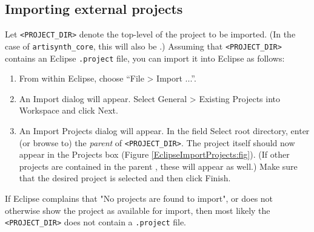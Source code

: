 \subsection{Importing external projects}
\label{importingExternalProjects}

Let {\tt <PROJECT\_DIR>} denote the top-level \directory{}
of the project to be imported.
(In the case of {\tt artisynth\_core}, this will also be
\ArtHome[].) Assuming that {\tt <PROJECT\_DIR>} contains an Eclipse {\tt .project}
file, you can import it into Eclipse as follows:

\begin{enumerate}

\item From within Eclipse, choose ``{\sf File > Import ...}''.

\item An {\sf Import} dialog will appear. 
Select {\sf General > Existing Projects into Workspace} and click {\sf Next}.

\item An {\sf Import Projects} dialog will appear. 
In the field {\sf Select root directory}, enter (or browse to) the
{\it parent} \directory{} of {\tt <PROJECT\_DIR>}. The project
itself should now appear in the {\sf Projects} box (Figure
\ref{EclipseImportProjects:fig}). (If other projects are contained in the 
parent \directory{}, these will appear as well.)
Make sure that the
desired project is selected and then click {\sf Finish}.

\end{enumerate}

\begin{sideblock}
If Eclipse complains that {\sf "No projects are found to import"}, or
does not otherwise show the project as available for import,
then most likely the {\tt <PROJECT\_DIR>}
\directory{} does not contain a {\tt .project} file.
\end{sideblock}

